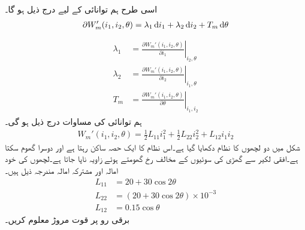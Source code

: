 اسی طرح ہم توانائی کے لیے درج ذیل ہو گا۔
\begin{align}
\partial W_m'(i_1,i_2,\theta)=\lambda_1 \dif i_1+\lambda_2 \dif i_2+T_m \dif \theta
\end{align}
%
\begin{gather}
\begin{aligned}\label{مساوات_تبادلہ_کوتوانائی_سے_مروڑ}
\lambda_1&=\left.\frac{\partial W_m'(i_1,i_2,\theta)}{\partial i_1} \right|_{i_2,\theta}\\
\lambda_2&=\left.\frac{\partial W_m'(i_1,i_2,\theta)}{\partial i_2} \right|_{i_1,\theta}\\
T_m&=\left.\frac{\partial W_m'(i_1,i_2,\theta)}{\partial \theta} \right|_{i_1,i_2}
\end{aligned}
\end{gather}
ہم توانائی کی مساوات درج ذیل ہو گی۔
\begin{align}\label{مساوات_تبادلہ_کوتوانائی_از_خود}
W_m'(i_1,i_2,\theta)=\frac{1}{2} L_{11} i_1^2+\frac{1}{2} L_{22} i_2^2+L_{12} i_1 i_2
\end{align}
%
شکل   میں دو لچھوں کا نظام دکھایا گیا ہے۔اس نظام کا ایک حصہ ساکن رہتا ہے اور دوسرا گھوم سکتا ہے۔افقی لکیر سے گھڑی کی سوئیوں  کے مخالف رخ گھومتے ہوئے  زاویہ   ناپا جاتا ہے۔لچھوں کی خود امالہ اور مشترکہ امالہ مندرجہ ذیل ہیں۔
\begin{align*}
L_{11}&=20+30\cos 2 \theta\\
L_{22}&=\left(20+30\cos 2\theta \right) \times 10^{-3}\\
L_{12}&=0.15 \cos \theta
\end{align*}
 برقی رو   پر قوت مروڑ  معلوم کریں۔
